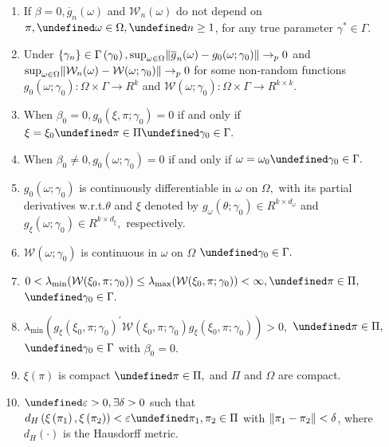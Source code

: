 \documentclass[11pt]{article}
\newcommand*{\W}{\mathcal{W}}
\newcommand*{\pto}{\ensuremath{\rightarrow_p}}
\DeclarePairedDelimiter\norm{\lVert}{\rVert}
\let\oldforall\forall
\let\forall\undefined
\DeclareMathOperator{\forall}{\oldforall}
\begin{document}
\begin{enumerate}
    \item If $\beta=0, \overline{g}_{n}(\omega )$ and $\W_{n}(\omega)$ do not depend on $\pi, 
        \forall \omega \in \Omega, \forall n\geq1$, for any true parameter $\gamma^{\ast}\in \Gamma.$
    \item Under $\lbrace \gamma_{n} \rbrace \in \Gamma\left(\gamma _{0}\right), \sup_{\omega \in \Omega}
        \norm*{\overline{g}_{n}(\omega) - g_{0}(\omega; \gamma_{0})} \pto 0$ and $\sup_{\omega \in
        \Omega} \norm{\W_{n}(\omega)-\W(\omega; \gamma _{0})} \pto 0$ for some
        non-random functions $g_{0}(\omega; \gamma_{0}):\Omega \times \Gamma \rightarrow R^{k}$ and
        $\W(\omega; \gamma _{0}):\Omega \times \Gamma \rightarrow R^{k\times k}.$
\item When $\beta_{0}=0,  g_{0}(\xi ,\pi ;\gamma _{0})=0$ if and only if $\xi =\xi _{0} \forall \pi \in
    \Pi \forall \gamma _{0}\in \Gamma.$
\item When $\beta_{0}\neq 0, g_{0}(\omega; \gamma _{0})=0$ if and only if $\omega =\omega _{0} \forall \gamma
    _{0}\in \Gamma.$
\item  $g_{0}(\omega ;\gamma _{0})$ is continuously differentiable in $\omega $ on $\Omega,$ with its partial
    derivatives w.r.t.\@ $\theta$ and $\xi$ denoted by $g_{\omega }(\theta ;\gamma _{0})\in R^{k\times
    d_{\omega }}$ and $g_{\xi }(\omega ;\gamma _{0})\in R^{k\times d_{\xi }},$ respectively.
\item $\W(\omega ;\gamma _{0})$ is continuous in $\omega$ on $\Omega$ $\forall \gamma _{0}\in \Gamma.$
\item $0 < \lambda _{\min}(\W(\xi_{0}, \pi ;\gamma _{0}))\leq \lambda _{\max }(\W(\xi
    _{0},\pi ;\gamma _{0})) < \infty, \forall \pi \in \Pi ,$ $\forall \gamma _{0}\in \Gamma .$
\item $\lambda _{\min} (g_{\xi}(\xi_{0},\pi ;\gamma _{0})^{\prime }\W(\xi _{0},\pi ;\gamma _{0})g_{\xi
    }(\xi _{0},\pi ;\gamma _{0}))>0,$ $\forall \pi \in \Pi ,$ $\forall \gamma _{0}\in \Gamma $ with $\beta_{0}=0.$
\item$\xi (\pi)$ is compact $\forall \pi \in \Pi ,$ and $\Pi $ and $\Omega $ are compact.
\item $\forall \varepsilon > 0, \exists \delta > 0$ such that $d_{H}\left(\xi \left(\pi _{1}\right) ,\xi \left(
    \pi _{2}\right) \right) < \varepsilon \forall \pi_{1}, \pi_{2}\in \Pi$ with $\norm*{\pi _{1}-\pi
    _{2}} <\delta$, where $d_{H}\left( \cdot \right) $ is the Hausdorff metric.
\end{enumerate}
\end{document}
